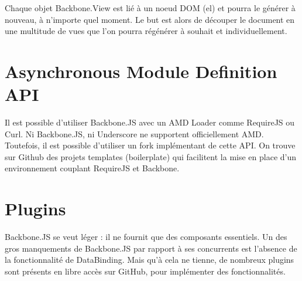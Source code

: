 Chaque objet Backbone.View est lié à un noeud DOM (el) et pourra le générer à nouveau, à n’importe quel moment. Le but est alors de découper le document en une multitude de vues que l’on pourra régénérer à souhait et individuellement. 

\section*{Asynchronous Module Definition API}

Il est possible d’utiliser Backbone.JS avec un AMD Loader comme RequireJS ou Curl. Ni Backbone.JS, ni Underscore ne supportent officiellement AMD. Toutefois, il est possible d’utiliser un fork implémentant de cette API.
On trouve sur Github des projets templates (boilerplate) qui facilitent la mise en place d’un environnement couplant RequireJS et Backbone. 

\section*{Plugins}


Backbone.JS se veut léger : il ne fournit que des composants essentiels. Un des gros manquements de Backbone.JS par rapport à ses concurrents est l’absence de la fonctionnalité de DataBinding. Mais qu’à cela ne tienne, de nombreux plugins sont présents en libre accès sur GitHub, pour implémenter des fonctionnalités. 
